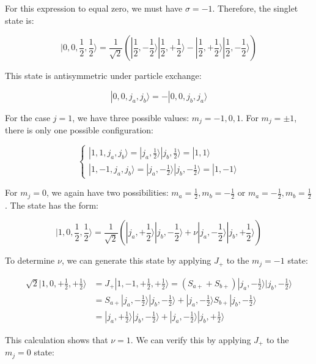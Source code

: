 \documentclass[italian]{HKNdocument}
\begin{document}
For this expression to equal zero, we must have $\sigma=-1$. Therefore, the singlet state is:

\begin{equation}
|0,0,\frac{1}{2},\frac{1}{2}\rangle=\frac{1}{\sqrt{2}}(|\frac{1}{2},-\frac{1}{2}\rangle|\frac{1}{2},+\frac{1}{2}\rangle-|\frac{1}{2},+\frac{1}{2}\rangle|\frac{1}{2},-\frac{1}{2}\rangle)
\end{equation}

This state is antisymmetric under particle exchange:

\begin{equation}
|0,0,j_a,j_b\rangle=-|0,0,j_b,j_a\rangle
\end{equation}

For the case $j=1$, we have three possible values: $m_j=-1,0,1$. For $m_j=\pm 1$, there is only one possible configuration:

\[
\left\{\begin{array}{l}
|1,1,j_a,j_b\rangle=|j_a,\frac{1}{2}\rangle|j_b,\frac{1}{2}\rangle=|1,1\rangle  \\
|1,-1,j_a,j_b\rangle=|j_a,-\frac{1}{2}\rangle|j_b,-\frac{1}{2}\rangle=|1,-1\rangle
\end{array}\right.
\]

For $m_j=0$, we again have two possibilities: $m_a=\frac{1}{2}, m_b=-\frac{1}{2}$ or $m_a=-\frac{1}{2}, m_b=\frac{1}{2}$. The state has the form:

\begin{equation}
|1,0,\frac{1}{2},\frac{1}{2}\rangle=\frac{1}{\sqrt{2}}(|j_a,+\frac{1}{2}\rangle|j_b,-\frac{1}{2}\rangle+\nu|j_a,-\frac{1}{2}\rangle|j_b,+\frac{1}{2}\rangle)
\end{equation}

To determine $\nu$, we can generate this state by applying $J_+$ to the $m_j=-1$ state:

\begin{align}
\sqrt{2}|1,0,+\frac{1}{2},+\frac{1}{2}\rangle &= J_{+}|1,-1,+\frac{1}{2},+\frac{1}{2}\rangle=(S_{a+}+S_{b+})|j_a,-\frac{1}{2}\rangle|j_b,-\frac{1}{2}\rangle \\
&= S_{a+}|j_a,-\frac{1}{2}\rangle|j_b,-\frac{1}{2}\rangle+|j_a,-\frac{1}{2}\rangle S_{b+}|j_b,-\frac{1}{2}\rangle \\
&= |j_a,+\frac{1}{2}\rangle|j_b,-\frac{1}{2}\rangle+|j_a,-\frac{1}{2}\rangle|j_b,+\frac{1}{2}\rangle
\end{align}

This calculation shows that $\nu=1$. We can verify this by applying $J_+$ to the $m_j=0$ state:
\end{document}
